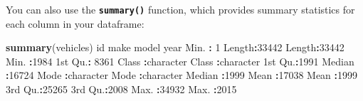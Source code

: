 \documentclass[
]{book}
\newenvironment{Shaded}{\begin{snugshade}}{\end{snugshade}}
\newcommand{\DecValTok}[1]{\textcolor[rgb]{0.00,0.00,0.81}{#1}}
\newcommand{\FunctionTok}[1]{\textcolor[rgb]{0.13,0.29,0.53}{\textbf{#1}}}
\newcommand{\NormalTok}[1]{#1}
\newcommand{\SpecialCharTok}[1]{\textcolor[rgb]{0.81,0.36,0.00}{\textbf{#1}}}
\newcommand{\StringTok}[1]{\textcolor[rgb]{0.31,0.60,0.02}{#1}}
\begin{document}
\begin{Shaded}
\end{Shaded}

You can also use the \textbf{\texttt{summary()}} function, which provides summary statistics for each column in your dataframe:

\begin{Shaded}
\begin{Highlighting}[]
\FunctionTok{summary}\NormalTok{(vehicles)}
\NormalTok{       id            make              model                year     }
\NormalTok{ Min.   }\SpecialCharTok{:}    \DecValTok{1}\NormalTok{   Length}\SpecialCharTok{:}\DecValTok{33442}\NormalTok{       Length}\SpecialCharTok{:}\DecValTok{33442}\NormalTok{       Min.   }\SpecialCharTok{:}\DecValTok{1984}  
 \DecValTok{1}\NormalTok{st Qu.}\SpecialCharTok{:} \DecValTok{8361}\NormalTok{   Class }\SpecialCharTok{:}\NormalTok{character   Class }\SpecialCharTok{:}\NormalTok{character   }\DecValTok{1}\NormalTok{st Qu.}\SpecialCharTok{:}\DecValTok{1991}  
\NormalTok{ Median }\SpecialCharTok{:}\DecValTok{16724}\NormalTok{   Mode  }\SpecialCharTok{:}\NormalTok{character   Mode  }\SpecialCharTok{:}\NormalTok{character   Median }\SpecialCharTok{:}\DecValTok{1999}  
\NormalTok{ Mean   }\SpecialCharTok{:}\DecValTok{17038}\NormalTok{                                         Mean   }\SpecialCharTok{:}\DecValTok{1999}  
 \DecValTok{3}\NormalTok{rd Qu.}\SpecialCharTok{:}\DecValTok{25265}                                         \DecValTok{3}\NormalTok{rd Qu.}\SpecialCharTok{:}\DecValTok{2008}  
\NormalTok{ Max.   }\SpecialCharTok{:}\DecValTok{34932}\NormalTok{                                         Max.   }\SpecialCharTok{:}\DecValTok{2015}  
                                                                     

\end{Highlighting}
\end{Shaded}
\end{document}
